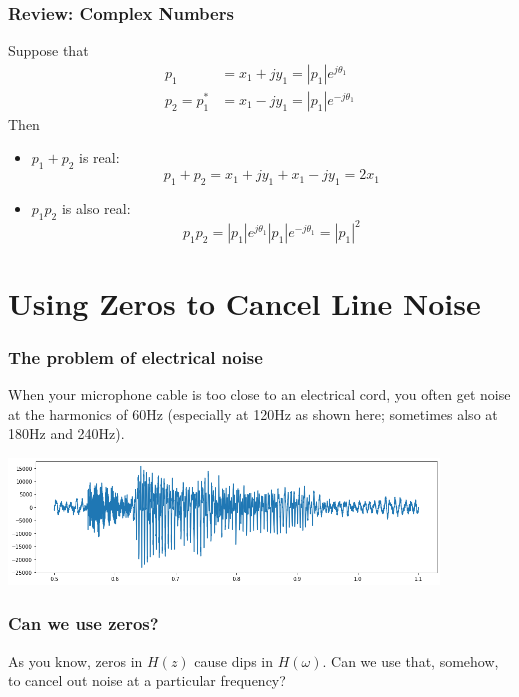 \documentclass{beamer}
\begin{document}
\begin{frame}
  \frametitle{Review: Complex Numbers}

  Suppose that
  \begin{align*}
    p_1 &= x_1+jy_1 = |p_1|e^{j\theta_1}\\
    p_2=p_1^* &= x_1-jy_1 = |p_1|e^{-j\theta_1}
  \end{align*}
  Then
  \begin{itemize}
  \item $p_1+p_2$ is real:
    \begin{displaymath}
      p_1+p_2 = x_1+jy_1 + x_1-jy_1 = 2x_1
    \end{displaymath}
  \item $p_1p_2$ is also real:
    \begin{displaymath}
      p_1p_2 = |p_1|e^{j\theta_1} |p_1|e^{-j\theta_1} = |p_1|^2
    \end{displaymath}
  \end{itemize}
\end{frame}

\section[Line Noise]{Using Zeros to Cancel Line Noise}
\setcounter{subsection}{1}

\begin{frame}
  \frametitle{The problem of electrical noise}

  When your microphone cable is too close to an electrical cord, you
  often get noise at the harmonics of 60Hz (especially at 120Hz as
  shown here; sometimes also at 180Hz and 240Hz).
  \centerline{\includegraphics[width=4.5in]{waveform_with_120hz.png}}
\end{frame}

\begin{frame}
  \frametitle{Can we use zeros?}

  As you know, zeros in $H(z)$ cause dips in $H(\omega)$.  Can we use that, somehow,
  to cancel out noise at a particular frequency?
  \centerline{}
\end{frame}
\end{document}
